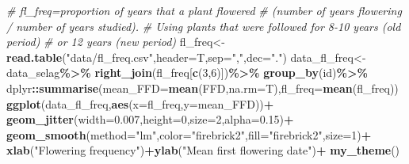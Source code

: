 \documentclass[
]{article}
\newenvironment{Shaded}{\begin{snugshade}}{\end{snugshade}}
\newcommand{\CommentTok}[1]{\textcolor[rgb]{0.56,0.35,0.01}{\textit{#1}}}
\newcommand{\DataTypeTok}[1]{\textcolor[rgb]{0.13,0.29,0.53}{#1}}
\newcommand{\DecValTok}[1]{\textcolor[rgb]{0.00,0.00,0.81}{#1}}
\newcommand{\FloatTok}[1]{\textcolor[rgb]{0.00,0.00,0.81}{#1}}
\newcommand{\KeywordTok}[1]{\textcolor[rgb]{0.13,0.29,0.53}{\textbf{#1}}}
\newcommand{\NormalTok}[1]{#1}
\newcommand{\OperatorTok}[1]{\textcolor[rgb]{0.81,0.36,0.00}{\textbf{#1}}}
\newcommand{\StringTok}[1]{\textcolor[rgb]{0.31,0.60,0.02}{#1}}
\begin{document}
\begin{Shaded}
\begin{Highlighting}[]
\CommentTok{\# fl\_freq=proportion of years that a plant flowered}
\CommentTok{\# (number of years flowering / number of years studied).}
\CommentTok{\# Using plants that were followed for 8{-}10 years (old period)}
\CommentTok{\# or 12  years (new period)}
\NormalTok{fl\_freq\textless{}{-}}\KeywordTok{read.table}\NormalTok{(}\StringTok{"data/fl\_freq.csv"}\NormalTok{,}\DataTypeTok{header=}\NormalTok{T,}\DataTypeTok{sep=}\StringTok{","}\NormalTok{,}\DataTypeTok{dec=}\StringTok{"."}\NormalTok{)}
\NormalTok{data\_fl\_freq\textless{}{-}data\_selag}\OperatorTok{\%\textgreater{}\%}
\StringTok{  }\KeywordTok{right\_join}\NormalTok{(fl\_freq[}\KeywordTok{c}\NormalTok{(}\DecValTok{3}\NormalTok{,}\DecValTok{6}\NormalTok{)])}\OperatorTok{\%\textgreater{}\%}
\StringTok{  }\KeywordTok{group\_by}\NormalTok{(id)}\OperatorTok{\%\textgreater{}\%}
\StringTok{  }\NormalTok{dplyr}\OperatorTok{::}\KeywordTok{summarise}\NormalTok{(}\DataTypeTok{mean\_FFD=}\KeywordTok{mean}\NormalTok{(FFD,}\DataTypeTok{na.rm=}\NormalTok{T),}\DataTypeTok{fl\_freq=}\KeywordTok{mean}\NormalTok{(fl\_freq))}
\KeywordTok{ggplot}\NormalTok{(data\_fl\_freq,}\KeywordTok{aes}\NormalTok{(}\DataTypeTok{x=}\NormalTok{fl\_freq,}\DataTypeTok{y=}\NormalTok{mean\_FFD))}\OperatorTok{+}
\StringTok{  }\KeywordTok{geom\_jitter}\NormalTok{(}\DataTypeTok{width=}\FloatTok{0.007}\NormalTok{,}\DataTypeTok{height=}\DecValTok{0}\NormalTok{,}\DataTypeTok{size=}\DecValTok{2}\NormalTok{,}\DataTypeTok{alpha=}\FloatTok{0.15}\NormalTok{)}\OperatorTok{+}
\StringTok{  }\KeywordTok{geom\_smooth}\NormalTok{(}\DataTypeTok{method=}\StringTok{"lm"}\NormalTok{,}\DataTypeTok{color=}\StringTok{"firebrick2"}\NormalTok{,}\DataTypeTok{fill=}\StringTok{"firebrick2"}\NormalTok{,}\DataTypeTok{size=}\DecValTok{1}\NormalTok{)}\OperatorTok{+}
\StringTok{  }\KeywordTok{xlab}\NormalTok{(}\StringTok{"Flowering frequency"}\NormalTok{)}\OperatorTok{+}\KeywordTok{ylab}\NormalTok{(}\StringTok{"Mean first flowering date"}\NormalTok{)}\OperatorTok{+}
\StringTok{  }\KeywordTok{my\_theme}\NormalTok{()}
\end{Highlighting}
\end{Shaded}
\end{document}
